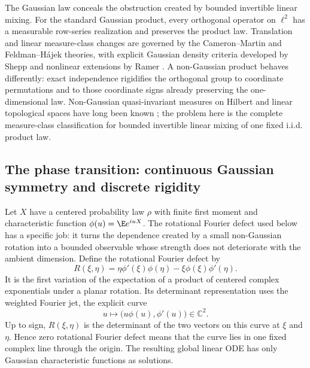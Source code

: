 The Gaussian law conceals the obstruction created by bounded invertible
linear mixing.
For the standard Gaussian product, every orthogonal operator on \(\ell^2\)
has a measurable row-series realization and preserves the product law.
Translation and linear measure-class changes are governed by the
Cameron--Martin and Feldman--H\'ajek theories, with explicit Gaussian
density criteria developed by Shepp and nonlinear extensions by Ramer
\cite{cameron1944transformations,feldman1958equivalence,hajek1958property,
shepp1966radon,ramer1974nonlinear,bogachev1998gaussian}.
A non-Gaussian product behaves differently: exact independence rigidifies
the orthogonal group to coordinate permutations and to those coordinate
signs already preserving the one-dimensional law.
Non-Gaussian quasi-invariant measures on Hilbert and linear topological
spaces have long been known
\cite{feldman1961examples,takahashi1975quasi}; the problem here is the
complete measure-class classification for bounded invertible linear mixing of one fixed
i.i.d. product law.

\subsection{The phase transition: continuous Gaussian symmetry and discrete rigidity}
\label{sec:phase-transition}

Let \(X\) have a centered probability law \(\rho\) with finite first moment
and characteristic function \(\phi(u)=\E e^{iuX}\).
The rotational Fourier defect used below has a specific job: it turns the
dependence created by a small non-Gaussian rotation into a bounded
observable whose strength does not deteriorate with the ambient dimension.
Define the rotational Fourier defect by
\begin{equation}
 R(\xi,\eta)=\eta\phi'(\xi)\phi(\eta)-\xi\phi(\xi)\phi'(\eta).
 \label{eq:fourier-defect}
\end{equation}
It is the first variation of the expectation of a product of centered
complex exponentials under a planar rotation.  Its determinant representation
uses the weighted Fourier jet, the explicit curve
\begin{equation}
 u\longmapsto\bigl(u\phi(u),\phi'(u)\bigr)\in\mathbb C^2.
 \label{eq:weighted-fourier-jet}
\end{equation}
Up to sign, \(R(\xi,\eta)\) is the determinant of the two vectors
on this curve at \(\xi\) and \(\eta\).
Hence zero rotational Fourier defect means that the curve lies in one fixed complex line
through the origin.
The resulting global linear ODE has only Gaussian characteristic functions
as solutions.

